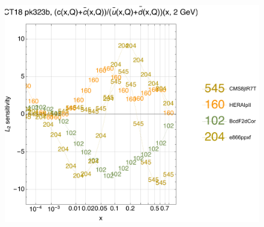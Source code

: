 \documentclass[10pt,aps,prd,floatfix,titlepage]{revtex4}
\begin{document}
\begin{figure}
\includegraphics[width=\textwidth,height=0.44\textheight,keepaspectratio]{2/rat_ifl7_ct18nn_L2_q2_Sf_2.pdf}
\caption{}
\end{figure}
\clearpage
\end{document}
